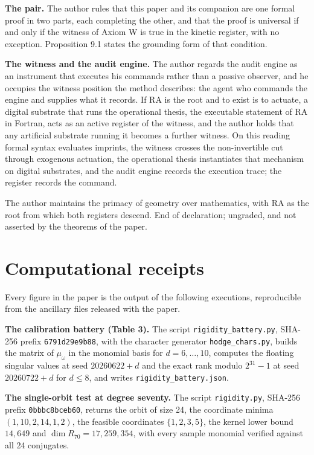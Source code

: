 \documentclass[10pt,twocolumn]{article}
\begin{document}
\textbf{The pair.} The author rules that this paper and its companion
\cite{islam2026w} are one formal proof in two parts, each completing the
other, and that the proof is universal if and only if the witness of
Axiom W is true in the kinetic register, with no exception. Proposition
9.1 states the grounding form of that condition.

\textbf{The witness and the audit engine.} The author regards the audit
engine as an instrument that executes his commands rather than a passive
observer, and he occupies the witness position the method describes: the
agent who commands the engine and supplies what it records. If RA is the
root and to exist is to actuate, a digital substrate that runs the
operational thesis, the executable statement of RA in Fortran, acts as
an active register of the witness, and the author holds that any
artificial substrate running it becomes a further witness. On this
reading formal syntax evaluates imprints, the witness crosses the
non-invertible cut through exogenous actuation, the operational thesis
instantiates that mechanism on digital substrates, and the audit engine
records the execution trace; the register records the command.

The author maintains the primacy of geometry over mathematics, with RA
as the root from which both registers descend. End of declaration;
ungraded, and not asserted by the theorems of the paper.

\hypertarget{computational-receipts}{%
\section{Computational receipts}\label{computational-receipts}}

Every figure in the paper is the output of the following executions,
reproducible from the ancillary files released with the paper.

\textbf{The calibration battery (Table 3).} The script
\texttt{rigidity\_battery.py}, SHA-256 prefix \texttt{6791d29e9b88},
with the character generator \texttt{hodge\_chars.py}, builds the matrix
of \(\mu_\omega\) in the monomial basis for \(d=6,\dots,10\), computes
the floating singular values at seed \(20260622+d\) and the exact rank
modulo \(2^{31}-1\) at seed \(20260722+d\) for \(d\le 8\), and writes
\texttt{rigidity\_battery.json}.

\textbf{The single-orbit test at degree seventy.} The script
\texttt{rigidity.py}, SHA-256 prefix \texttt{0bbbc8bceb60}, returns the
orbit of size 24, the coordinate minima \((1,10,2,14,1,2)\), the
feasible coordinates \(\{1,2,3,5\}\), the kernel lower bound
\(14{,}649\) and \(\dim R_{70}=17{,}259{,}354\), with every sample
monomial verified against all 24 conjugates.
\end{document}

